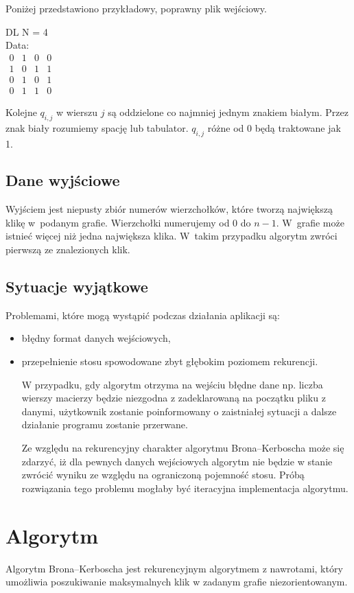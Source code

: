 \documentclass[12pt, a4paper]{article}
\begin{document}
\newpage
Poniżej przedstawiono przykładowy, poprawny plik wejściowy.

\bigskip
DL N = 4 \\
Data: \\
$ 
\begin{array}{cccc}
0 & 1 & 0 & 0 \\
1 & 0 & 1 & 1 \\
0 & 1 & 0 & 1 \\
0 & 1 & 1 & 0
\end{array}
$
\bigskip

Kolejne $q_{i,j}$ w wierszu $j$ są oddzielone co najmniej jednym znakiem białym. 
Przez znak biały rozumiemy spację lub tabulator. $q_{i,j}$ różne od 0 będą traktowane jak 1.
\subsection{Dane wyjściowe}
Wyjściem jest niepusty zbiór numerów wierzchołków, które tworzą największą klikę w~podanym grafie. 
Wierzchołki numerujemy od 0 do $n-1$. W~grafie może istnieć więcej niż jedna największa klika.
W~takim przypadku algorytm zwróci pierwszą ze znalezionych klik.
\subsection{Sytuacje wyjątkowe}
Problemami, które mogą wystąpić podczas działania aplikacji są:
\begin{itemize}
	\item błędny format danych wejściowych,
	\item przepełnienie stosu spowodowane zbyt głębokim poziomem rekurencji.

\bigskip
W przypadku, gdy algorytm otrzyma na wejściu błędne dane np. liczba wierszy macierzy będzie niezgodna z zadeklarowaną na początku pliku z danymi, użytkownik zostanie poinformowany o zaistniałej sytuacji a dalsze działanie programu zostanie przerwane.

\bigskip
Ze względu na rekurencyjny charakter algorytmu Brona--Kerboscha może się zdarzyć, iż dla pewnych danych wejściowych algorytm nie będzie w stanie zwrócić wyniku ze względu na ograniczoną pojemność stosu.
Próbą rozwiązania tego problemu mogłaby być iteracyjna implementacja algorytmu.

\end{itemize}
\section{Algorytm}
\label{bron_kerbosch}
Algorytm Brona--Kerboscha jest rekurencyjnym algorytmem z nawrotami, który umożliwia poszukiwanie maksymalnych klik w zadanym grafie niezorientowanym.
\end{document}
